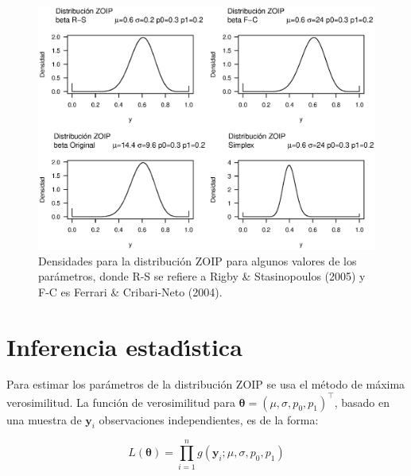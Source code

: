 \begin{figure}
	\begin{center}
		\includegraphics[scale=0.6]{Dist_ZOIP.eps}
		\caption{Densidades para la distribuci\'{o}n ZOIP para algunos valores de los par\'{a}metros, donde R-S se refiere a Rigby \& Stasinopoulos (2005) y F-C es Ferrari \& Cribari-Neto (2004).}
		\label{Dist_ZOIP}
	\end{center}
\end{figure}


\section{Inferencia estad\'{\i}stica}

Para estimar los par\'{a}metros de la distribuci\'{o}n ZOIP se usa el m\'{e}todo de m\'{a}xima verosimilitud. La funci\'{o}n de verosimilitud para $\boldsymbol{\theta}=(\mu, \sigma, p_0, p_1)^{\top}$, basado en una muestra de $\boldsymbol{y}_i$ observaciones independientes, es de la forma:

\begin{equation}
L(\boldsymbol{\theta})=\prod_{i=1}^{n}g(\mathbf{y}_i;\mu, \sigma, p_0, p_1) 
\label{F_likel}
\end{equation}



